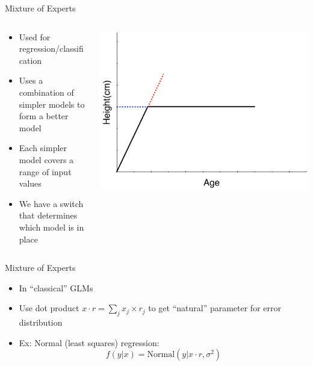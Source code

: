 \documentclass[aspectratio=169]{beamer}
\begin{document}
\begin{frame}{Mixture of Experts}

\begin{columns}
\begin{column}{0.5\textwidth}
\begin{itemize}
\item Used for regression/classification
\item Uses a combination of simpler models to form a better model
\item Each simpler model covers a range of input values
\item We have a switch that determines which model is in place
\end{itemize}
\end{column}
\begin{column}{0.5\textwidth}
\includegraphics[width=1\textwidth]{lectMM/ageVsHeightV1.pdf}
\end{column}
\end{columns}
\end{frame}

\begin{frame}{Mixture of Experts}

\begin{itemize}
	\item In ``classical'' GLMs
	\item Use dot product $x \cdot r = \sum_j x_j \times r_j$ to get ``natural'' parameter for error distribution
	\item Ex: Normal (least squares) regression:
	$$f (y | x) = \textrm{Normal} (y | x \cdot r, \sigma^2)$$
\end{itemize}
\end{frame}
\end{document}
